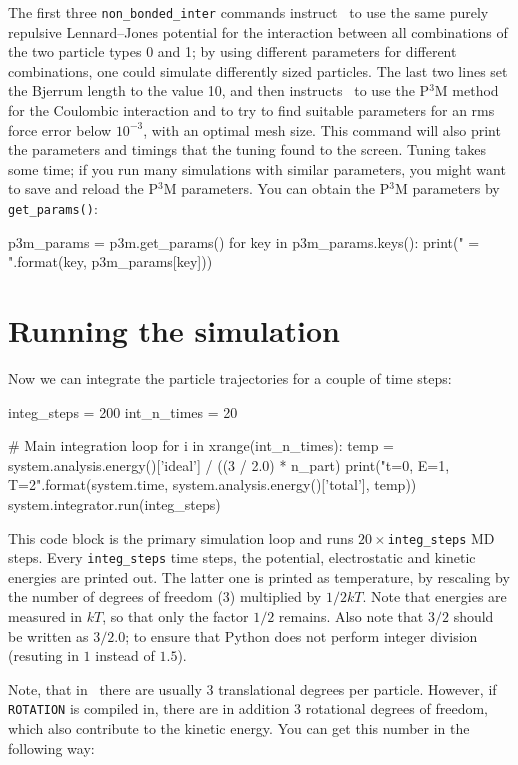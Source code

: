 \documentclass[
a4paper,                        %
11pt,                           %
twoside,                        %
footsepline,                    %
headsepline,                    %
headexclude,                    %
footexclude,                    %
pagesize,                       %
]{scrartcl}
\begin{document}
The first three \verb|non_bonded_inter| commands instruct \es\ to use the same
purely repulsive Lennard--Jones potential for the interaction between
all combinations of the two particle types 0 and 1; by using different
parameters for different combinations, one could simulate differently
sized particles.  The last two lines set the Bjerrum length to the value
10, and then instructs \es\ to use the P$^3$M method for the Coulombic
interaction and to try to find suitable parameters for an rms force
error below $10^{-3}$, with an optimal mesh size. This command will also print 
the parameters and timings that the tuning found to the screen. Tuning takes 
some time; if you run many simulations with similar parameters, you might want 
to save and reload
the P$^3$M parameters. You can obtain the P$^3$M parameters by
\verb|get_params()|:

\begin{tclcode}
p3m_params = p3m.get_params()
for key in p3m_params.keys():
    print("{} = {}".format(key, p3m_params[key]))
\end{tclcode}


\section{Running the simulation}

Now we can integrate the particle trajectories for a couple of time
steps:

\begin{tclcode}
integ_steps = 200
int_n_times = 20

# Main integration loop
for i in xrange(int_n_times):
    temp = system.analysis.energy()['ideal'] / ((3 / 2.0) * n_part)
    print("t={0}, E={1}, T={2}".format(system.time,
                                       system.analysis.energy()['total'], temp))
    system.integrator.run(integ_steps)
\end{tclcode}

This code block is the primary simulation loop and runs
$20\times$\verb|integ_steps| MD steps. Every \verb|integ_steps| time
steps, the potential, electrostatic and kinetic energies are printed
out. The latter one is printed as temperature, by rescaling by the
number of degrees of freedom (3) multiplied by $1/2kT$. Note that
energies are measured in $kT$, so that only the factor $1/2$
remains. Also note that $3/2$ should be written as $3/2.0$; to ensure
that Python does not perform integer division (resuting in $1$ instead of
$1.5$).

Note, that in \es\ there are usually 3 translational degrees per
particle. However, if \verb|ROTATION| is compiled in, there are in
addition 3 rotational degrees of freedom, which also contribute to the
kinetic energy.  You can get this number in the following way:
\end{document}
